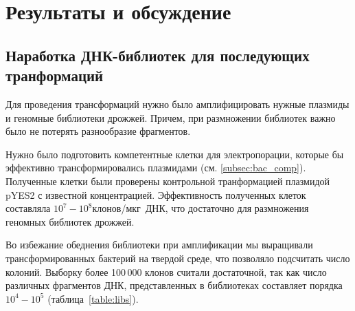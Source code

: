 \section{Результаты и обсуждение}

\subsection{Наработка ДНК-библиотек для последующих транформаций}

Для проведения трансформаций нужно было амплифицировать нужные плазмиды и геномные библиотеки дрожжей. Причем, при размножении библиотек важно было не потерять разнообразие фрагментов.



Нужно было подготовить компетентные клетки для электропорации, которые бы эффективно трансформировались плазмидами (см. \ref{subsec:bac_comp}). 
Полученные клетки были проверены контрольной транформацией плазмидой pYES2 с известной концентрацией. 
Эффективность полученных клеток составляла $10^7-10^8$клонов/мкг~ДНК, что  достаточно для размножения геномных библиотек дрожжей.



Во избежание обеднения библиотеки при амплификации мы выращивали трансформированных бактерий на твердой среде, что позволяло подсчитать число колоний. Выборку более 100\,000 клонов считали достаточной, так как число различных фрагментов ДНК, представленных в библиотеках составляет порядка $10^4-10^5$ (таблица~\ref{table:libs}).


